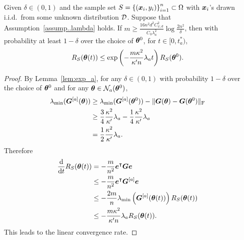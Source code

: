 \documentclass[twoside,11pt]{article}
\begin{document}
\begin{prop}
    Given $\delta\in(0,1)$ and the sample set $S = {\{(\bm{x}_i, y_i)\}}_{i=1}^n\subset\Omega$ with $\bm{x}_i$'s drawn i.i.d.\ from some unknown distribution $\mathcal{D}$. Suppose that Assumption~\ref{assump..lambda} holds. If $m\geq\frac{16n^2d^2C_{\psi,d}^2}{C_0\lambda_a^2}\log\frac{2n^2}{\delta}$, then with probability at least $1-\delta$ over the choice of $\bm{\theta}^0$, for $t\in[0,t^*_a)$,
    \begin{equation}
        R_S(\bm{\theta}(t))\leq\exp\left(-\frac{m\kappa^2}{\kappa'n}\lambda_at\right)R_S(\bm{\theta}^0).
    \end{equation}
\end{prop}
\begin{proof}
    By Lemma~\ref{lem:exp_a}, for any $\delta\in(0,1)$ with probability $1-\delta$ over the choice of $\bm{\theta}^0$ and for any $\bm{\theta}\in\mathcal{N}_a(\bm{\theta}^0)$,
    \begin{equation*}
        \begin{aligned}
            \lambda_{\min}(\bm{G}^{[a]}(\bm{\theta}))
             & \geq\lambda_{\min}(\bm{G}^{[a]}(\bm{\theta}^0))-\lVert\bm{G}(\bm{\theta})-\bm{G}(\bm{\theta}^0)\rVert_\mathrm{F}         \\
             & \geq \frac{3}{4}\frac{\kappa^2}{\kappa'}\lambda_a-\frac{1}{4}\frac{\kappa^2}{\kappa'}\lambda_a \\
             & = \frac{1}{2}\frac{\kappa^2}{\kappa'}\lambda_a.
        \end{aligned}
    \end{equation*}
    Therefore
    \begin{equation*}
        \begin{aligned}
            \frac{\mathrm{d}}{\mathrm{d} t}R_S(\bm{\theta}(t))
             & = -\frac{m}{n^2}\bm{e}^{\intercal}\bm{G}\bm{e}                                                    \\
             & \leq -\frac{m}{n^2}\bm{e}^{\intercal}\bm{G}^{[a]}\bm{e}                                           \\
             & \leq -\frac{2m}{n}\lambda_{\min}\left(\bm{G}^{[a]}(\bm{\theta}(t))\right)R_S(\bm{\theta}(t)) \\
             & \leq -\frac{m\kappa^2}{\kappa'n}\lambda_aR_S(\bm{\theta}(t)).
        \end{aligned}
    \end{equation*}
    This leads to the linear convergence rate.
\end{proof}
\end{document}
